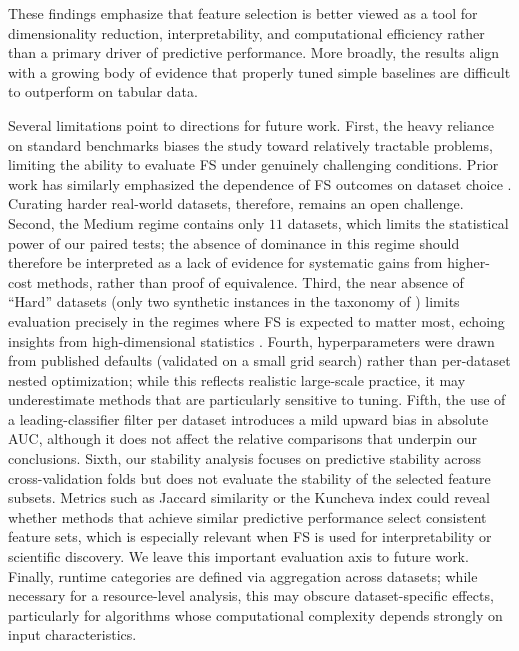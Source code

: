 \documentclass[preprint,12pt,authoryear]{elsarticle}
\begin{document}
{These findings emphasize that feature selection is better viewed as a tool for dimensionality reduction, interpretability, and computational efficiency rather than a primary driver of predictive performance. More broadly, the results align with a growing body of evidence that properly tuned simple baselines are difficult to outperform on tabular data.

Several limitations point to directions for future work. First, the heavy reliance on standard benchmarks biases the study toward relatively tractable problems, limiting the ability to evaluate FS under genuinely challenging conditions. Prior work has similarly emphasized the dependence of FS outcomes on dataset choice \citep{bommert2020benchmark}. Curating harder real-world datasets, therefore, remains an open challenge. Second, the Medium regime contains only $11$ datasets, which limits the statistical power of our paired tests; the absence of dominance in this regime should therefore be interpreted as a lack of evidence for systematic gains from higher-cost methods, rather than proof of equivalence. Third, the near absence of ``Hard'' datasets (only two synthetic instances in the taxonomy of \cite{elmakias2025choosing}) limits evaluation precisely in the regimes where FS is expected to matter most, echoing insights from high-dimensional statistics \citep{donoho2000high}. Fourth, hyperparameters were drawn from published defaults (validated on a small grid search) rather than per-dataset nested optimization; while this reflects realistic large-scale practice, it may underestimate methods that are particularly sensitive to tuning. Fifth, the use of a leading-classifier filter per dataset introduces a mild upward bias in absolute AUC, although it does not affect the relative comparisons that underpin our conclusions. Sixth, our stability analysis focuses on predictive stability across cross-validation folds but does not evaluate the stability of the selected feature subsets. Metrics such as Jaccard similarity or the Kuncheva index could reveal whether methods that achieve similar predictive performance select consistent feature sets, which is especially relevant when FS is used for interpretability or scientific discovery. We leave this important evaluation axis to future work. Finally, runtime categories are defined via aggregation across datasets; while necessary for a resource-level analysis, this may obscure dataset-specific effects, particularly for algorithms whose computational complexity depends strongly on input characteristics.

}
\end{document}
